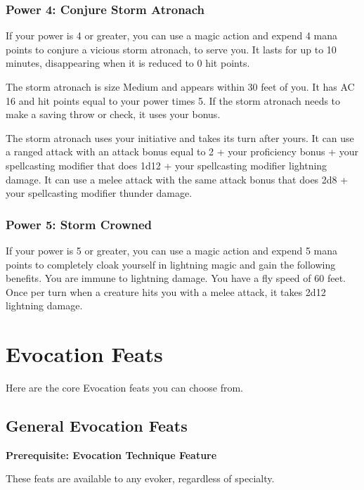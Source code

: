 \documentclass[12pt,letterpaper,twocolumn,openany,nodeprecatedcode,bg=none]{dndbook}
\begin{document}
\subsubsection{Power 4: Conjure Storm
Atronach}\label{power-4-conjure-storm-atronach}

If your power is 4 or greater, you can use a magic action and expend 4
mana points to conjure a vicious storm atronach, to serve you. It lasts
for up to 10 minutes, disappearing when it is reduced to 0 hit points.

The storm atronach is size Medium and appears within 30 feet of you. It
has AC 16 and hit points equal to your power times 5. If the storm
atronach needs to make a saving throw or check, it uses your bonus.

The storm atronach uses your initiative and takes its turn after yours.
It can use a ranged attack with an attack bonus equal to 2 + your
proficiency bonus + your spellcasting modifier that does 1d12 + your
spellcasting modifier lightning damage. It can use a melee attack with
the same attack bonus that does 2d8 + your spellcasting modifier thunder
damage.

\subsubsection{Power 5: Storm Crowned}\label{power-5-storm-crowned}

If your power is 5 or greater, you can use a magic action and expend 5
mana points to completely cloak yourself in lightning magic and gain the
following benefits. You are immune to lightning damage. You have a fly
speed of 60 feet. Once per turn when a creature hits you with a melee
attack, it takes 2d12 lightning damage.

\clearpage

\section{Evocation Feats}\label{evocation-feats}

Here are the core Evocation feats you can choose from.

\subsection{General Evocation Feats}\label{general-evocation-feats}

\textbf{Prerequisite: Evocation Technique Feature}

These feats are available to any evoker, regardless of specialty.
\end{document}
